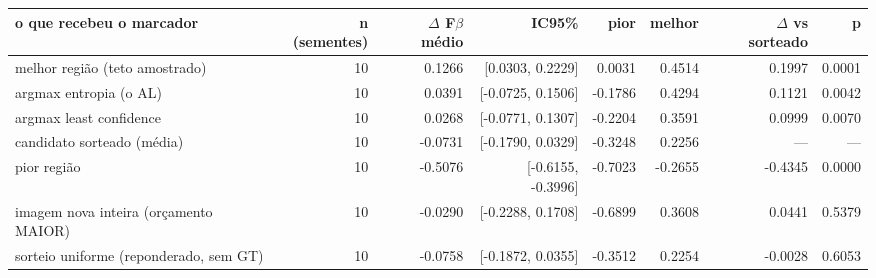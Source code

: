 \begin{adjustbox}{max width=\linewidth}
\begin{tabular}{lrrrrrrr}
\toprule
o que recebeu o marcador & n (sementes) & $\Delta$ F$\beta$ médio & IC95\% & pior & melhor & $\Delta$ vs sorteado & p \\
\midrule
melhor região (teto amostrado) & 10 & 0.1266 & [0.0303, 0.2229] & 0.0031 & 0.4514 & 0.1997 & 0.0001 \\
argmax entropia (o AL) & 10 & 0.0391 & [-0.0725, 0.1506] & -0.1786 & 0.4294 & 0.1121 & 0.0042 \\
argmax least confidence & 10 & 0.0268 & [-0.0771, 0.1307] & -0.2204 & 0.3591 & 0.0999 & 0.0070 \\
candidato sorteado (média) & 10 & -0.0731 & [-0.1790, 0.0329] & -0.3248 & 0.2256 & --- & --- \\
pior região & 10 & -0.5076 & [-0.6155, -0.3996] & -0.7023 & -0.2655 & -0.4345 & 0.0000 \\
imagem nova inteira (orçamento MAIOR) & 10 & -0.0290 & [-0.2288, 0.1708] & -0.6899 & 0.3608 & 0.0441 & 0.5379 \\
sorteio uniforme (reponderado, sem GT) & 10 & -0.0758 & [-0.1872, 0.0355] & -0.3512 & 0.2254 & -0.0028 & 0.6053 \\
\bottomrule
\end{tabular}
\end{adjustbox}
